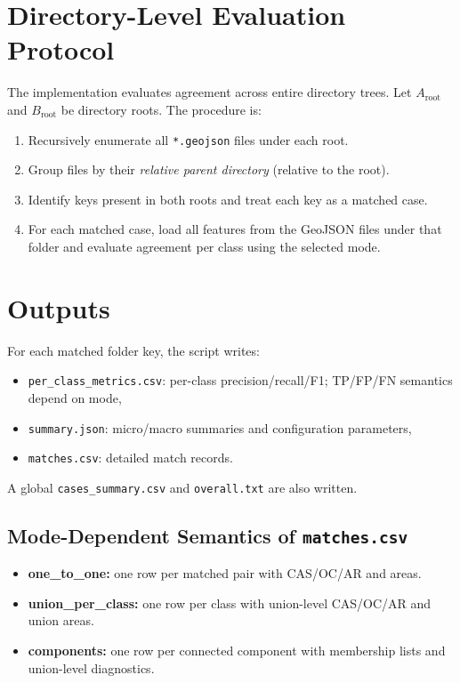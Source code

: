 \documentclass[11pt]{article}
\begin{document}
\section{Directory-Level Evaluation Protocol}
The implementation evaluates agreement across entire directory trees.
Let $A_{\mathrm{root}}$ and $B_{\mathrm{root}}$ be directory roots.
The procedure is:
\begin{enumerate}[leftmargin=*]
  \item Recursively enumerate all \texttt{*.geojson} files under each root.
  \item Group files by their \emph{relative parent directory} (relative to the root).
  \item Identify keys present in both roots and treat each key as a matched case.
  \item For each matched case, load all features from the GeoJSON files under that folder and evaluate agreement per class using the selected mode.
\end{enumerate}

\section{Outputs}
For each matched folder key, the script writes:
\begin{itemize}[leftmargin=*]
  \item \texttt{per\_class\_metrics.csv}: per-class precision/recall/F1; TP/FP/FN semantics depend on mode,
  \item \texttt{summary.json}: micro/macro summaries and configuration parameters,
  \item \texttt{matches.csv}: detailed match records.
\end{itemize}
A global \texttt{cases\_summary.csv} and \texttt{overall.txt} are also written.

\subsection{Mode-Dependent Semantics of \texttt{matches.csv}}
\begin{itemize}[leftmargin=*]
  \item \textbf{one\_to\_one:} one row per matched pair with CAS/OC/AR and areas.
  \item \textbf{union\_per\_class:} one row per class with union-level CAS/OC/AR and union areas.
  \item \textbf{components:} one row per connected component with membership lists and union-level diagnostics.
\end{itemize}
\end{document}
